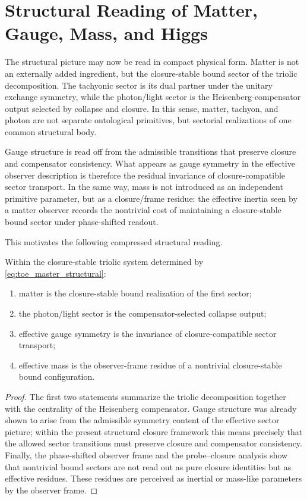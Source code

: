 \section{Structural Reading of Matter, Gauge, Mass, and Higgs}
\label{sec:structural-reading-physics}

The structural picture may now be read in compact physical form. Matter is not
an externally added ingredient, but the closure-stable bound sector of the
triolic decomposition. The tachyonic sector is its dual partner under the
unitary exchange symmetry, while the photon/light sector is the
Heisenberg-compensator output selected by collapse and closure. In this sense,
matter, tachyon, and photon are not separate ontological primitives, but
sectorial realizations of one common structural body.

Gauge structure is read off from the admissible transitions that preserve
closure and compensator consistency. What appears as gauge symmetry in the
effective observer description is therefore the residual invariance of
closure-compatible sector transport. In the same way, mass is not introduced
as an independent primitive parameter, but as a closure/frame residue: the
effective inertia seen by a matter observer records the nontrivial cost of
maintaining a closure-stable bound sector under phase-shifted readout.

This motivates the following compressed structural reading.

\begin{proposition}
\label{prop:structural-matter-gauge-mass}
Within the closure-stable triolic system determined by
\eqref{eq:toe_master_structural}:
\begin{enumerate}
\item matter is the closure-stable bound realization of the first sector;
\item the photon/light sector is the compensator-selected collapse output;
\item effective gauge symmetry is the invariance of closure-compatible
sector transport;
\item effective mass is the observer-frame residue of a nontrivial
closure-stable bound configuration.
\end{enumerate}
\end{proposition}

\begin{proof}
The first two statements summarize the triolic decomposition together with the
centrality of the Heisenberg compensator. Gauge structure was already shown to
arise from the admissible symmetry content of the effective sector picture;
within the present structural closure framework this means precisely that the
allowed sector transitions must preserve closure and compensator consistency.
Finally, the phase-shifted observer frame and the probe--closure analysis show
that nontrivial bound sectors are not read out as pure closure identities but
as effective residues. These residues are perceived as inertial or mass-like
parameters by the observer frame.
\end{proof}

